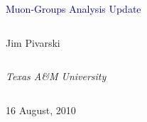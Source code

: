 \documentclass[compress]{beamer}
\begin{document}
\begin{frame}
\vfill
\begin{center}
\textcolor{darkblue}{\Large Muon-Groups Analysis Update}

\vfill
\begin{columns}
\begin{center}
\large
Jim Pivarski
\end{center}
\end{columns}

\begin{columns}
\begin{center}
\scriptsize
{\it Texas A\&M University}
\end{center}
\end{columns}

\vfill
16 August, 2010

\end{center}
\end{frame}


\small
\end{document}

